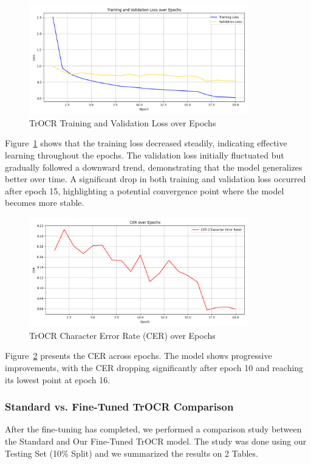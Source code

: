 \begin{figure}[H]
    \centering
    \includegraphics[width=0.85\textwidth]{Figures/Chapter 3/trocr_training_validation_loss.png}
    \caption{TrOCR Training and Validation Loss over Epochs}
    \label{fig:trocrtraining_validation_loss}
\end{figure}

Figure~\ref{fig:trocrtraining_validation_loss} shows that the training loss decreased steadily, indicating effective learning throughout the epochs. The validation loss initially fluctuated but gradually followed a downward trend, demonstrating that the model generalizes better over time. A significant drop in both training and validation loss occurred after epoch 15, highlighting a potential convergence point where the model becomes more stable.

\begin{figure}[H]
    \centering
    \includegraphics[width=0.85\textwidth]{Figures/Chapter 3/trocr_cer_over_epochs.png}
    \caption{TrOCR Character Error Rate (CER) over Epochs}
    \label{fig:trocrcer_over_epochs}
\end{figure}

Figure~\ref{fig:trocrcer_over_epochs} presents the CER across epochs. The model shows progressive improvements, with the CER dropping significantly after epoch 10 and reaching its lowest point at epoch 16. 

\subsubsection{Standard vs. Fine-Tuned TrOCR Comparison}
After the fine-tuning has completed, we performed a comparison study between the Standard and Our Fine-Tuned TrOCR model. The study was done using our Testing Set (10\% Split) and we summarized the results on 2 Tables.

